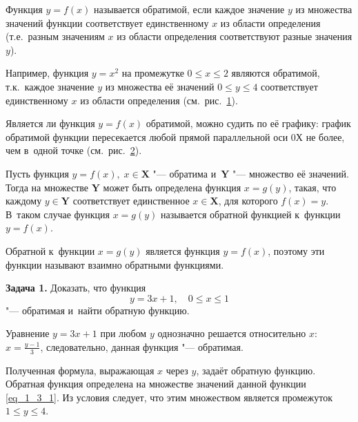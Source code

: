 \begin{Def}
Функция $y = f(x)$ называется обратимой, если каждое значение $y$
из множества значений функции соответствует единственному $x$
из области определения (т.е.\ разным значениям $x$ из области определения
соответствуют разные значения $y$).
\end{Def}

Например, функция $y = x^{2}$ на промежутке $0 \leqslant x \leqslant 2$
являются обратимой, т.к.\ каждое значение $y$ из множества её значений
$0 \leqslant y \leqslant 4$ соответствует единственному $x$ из области
определения (см.\ рис.\ \ref{fig_1_3_6}).

\begin{figure}\label{fig_1_3_6}
\end{figure}

Является ли функция $y = f(x)$ обратимой, можно судить по её графику:
график обратимой функции пересекается любой прямой параллельной оси 0Х
не более, чем в~одной точке (см.\ рис.\ \ref{fig_1_3_7}).

\begin{figure}\label{fig_1_3_7}
\end{figure}

\begin{Def}
Пусть функция $y = f(x), \; x \in \mathbf{X}$ "--- обратима
и~$\mathbf{Y}$ "--- множество её значений.
Тогда на множестве $\mathbf{Y}$ может быть определена функция $x = g(y)$,
такая, что каждому $y \in \mathbf{Y}$ соответствует единственное
$x \in \mathbf{X}$, для которого $f(x) = y$.
В~таком случае функция $x = g(y)$ называется обратной функцией
к~функции $y = f(x)$.
\end{Def}

Обратной к~функции $x = g(y)$ является функция $y = f(x)$, поэтому эти функции
называют взаимно обратными функциями.

\textbf{Задача 1.} Доказать, что функция
\begin{equation}\label{eq_1_3_1}
y = 3x + 1, \quad 0 \leqslant x \leqslant 1
\end{equation}
"--- обратимая и~найти обратную функцию.

Уравнение $y = 3x + 1$ при любом $y$ однозначно решается относительно $x$:
$\displaystyle x = \frac{y-1}{3}$, следовательно, данная функция "--- обратимая.

Полученная формула, выражающая $x$ через $y$, задаёт обратную функцию.
Обратная функция определена на множестве значений данной функции \eqref{eq_1_3_1}.
Из условия следует, что этим множеством является промежуток $1 \leqslant y \leqslant 4$.


